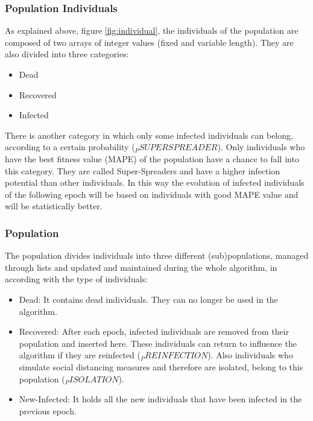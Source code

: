 \documentclass[letterpaper]{article}%
\begin{document}
\subsubsection{Population Individuals}
	As explained above, figure \ref{fig:individual}, the individuals of the population are composed of two arrays of integer values (fixed and variable length). They are also divided into three categories:
\begin{itemize}
\item Dead
\item Recovered
\item Infected
\end{itemize}
There is another category in which only some infected individuals can belong, according to a certain probability ($_PSUPERSPREADER$). Only individuals who have the best fitness value (MAPE) of the population have a chance to fall into this category. They are called Super-Spreaders and have a higher infection potential than other individuals. In this way the evolution of infected individuals of the following epoch will be based on individuals with good MAPE value and will be statistically better.

\subsubsection{Population}
	The population divides individuals into three different (sub)populations, managed through lists and updated and maintained during the whole algorithm, in according with the type of individuals:
\begin{itemize}
\item Dead: It contains dead individuals. They can no longer be used in the algorithm.
\item Recovered: After each epoch, infected individuals are removed from their population and inserted here. These individuals can return to influence the algorithm if they are reinfected ($_PREINFECTION$). Also individuals who simulate social distancing measures and therefore are isolated, belong to this population ($_PISOLATION$).
\item New-Infected: It holds all the new individuals that have been infected in the previous epoch.
\end{itemize}
\end{document}
